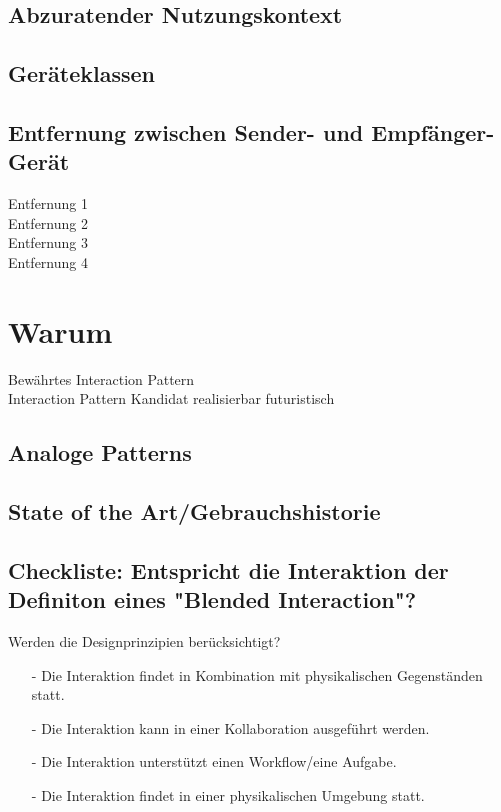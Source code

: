 \validcontext

\subsection*{Abzuratender Nutzungskontext}
\notvalidcontext

\subsection*{Geräteklassen}
\devicetabular

\subsection*{Entfernung zwischen Sender- und Empfänger-Gerät}
\checkbox{\distanceA} Entfernung 1 \\
\checkbox{\distanceB} Entfernung 2 \\
\checkbox{\distanceC} Entfernung 3 \\
\checkbox{\distanceD} Entfernung 4 


\section*{Warum}

\checkbox{\established} Bewährtes Interaction Pattern \\
\checkbox{\candidate} Interaction Pattern Kandidat 
\checkbox{\realizable} realisierbar
\checkbox{\futuristic} futuristisch 

\subsection*{Analoge Patterns}
\otherpatterns

\subsection*{State of the Art/Gebrauchshistorie}
\stateoftheart

\subsection*{Checkliste: Entspricht die Interaktion der Definiton eines "Blended Interaction"?}
\checkbox{\designprinciples} Werden die Designprinzipien berücksichtigt?
\begin{itemize}
\item[-] Die Interaktion findet in Kombination mit physikalischen Gegenständen statt.
\item[-] Die Interaktion kann in einer Kollaboration ausgeführt werden.
\item[-] Die Interaktion unterstützt einen Workflow/eine Aufgabe.
\item[-] Die Interaktion findet in einer physikalischen Umgebung statt.
\end{itemize}


